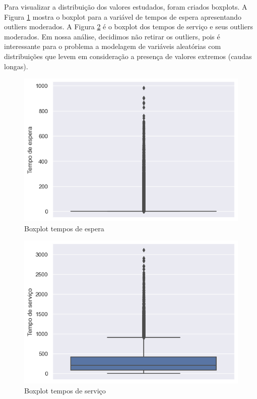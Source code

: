Para visualizar a distribuição dos valores estudados, foram criados boxplots. A Figura \ref*{fig: box-wait} mostra o boxplot para a variável de tempos de espera apresentando outliers moderados. A Figura \ref*{fig: box-time} é o boxplot dos tempos de serviço e seus outliers moderados. Em nossa análise, decidimos não retirar os outliers, pois é interessante para o problema a modelagem de variáveis aleatórias com distribuições que levem em consideração a presença de valores extremos (caudas longas).

\begin{figure}[H]
    \includegraphics{analise-de-dados/anual/box-wait.png}
    \caption{Boxplot tempos de espera}
    \label{fig: box-wait}
\end{figure}

\begin{figure}[H]
    \includegraphics{analise-de-dados/anual/box-service.png}
    \caption{Boxplot tempos de serviço}
    \label{fig: box-time}
\end{figure}

